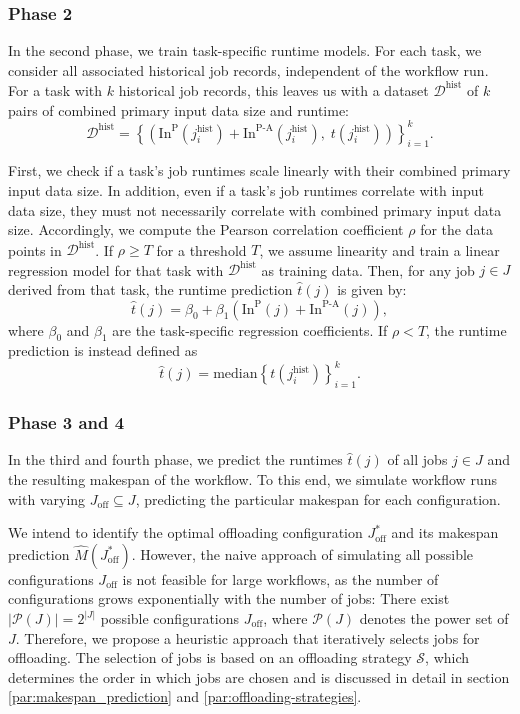 \subsubsection{Phase 2}
 In the second phase, we train task-specific runtime models. 
 For each task, we consider all associated historical job records, independent of the workflow run. For a task with $k$ historical job records, this leaves us with a dataset $\mathcal{D}^\text{hist}$ of $k$ pairs of combined primary input data size and runtime: \[ \mathcal{D}^\text{hist}=\left\{\left(\text{In}^\text{P}(j_i^\text{hist}) + \text{In}^\text{P-A}(j_i^\text{hist}),\; t(j_i^\text{hist})\right)\right\}_{i=1}^{k}. \] 
 
 First, we check if a task's job runtimes scale linearly with their combined primary input data size. 
 In addition, even if a task's job runtimes correlate with input data size, they must not necessarily correlate with combined primary input data size.
 Accordingly, we compute the Pearson correlation coefficient $\rho$ for the data points in $\mathcal{D}^\text{hist}$. If $\rho \geq T$ for a threshold $T$, we assume linearity and train a linear regression model for that task with $\mathcal{D}^\text{hist}$ as training data. Then, for any job $j \in J$ derived from that task, the runtime prediction $\hat{t}(j)$ is given by: \[ \hat{t}(j) = \beta_{0} + \beta_{1} (\text{In}^\text{P}(j) + \text{In}^\text{P-A}(j)), \] where \( \beta_{0} \) and \( \beta_{1} \) are the task-specific regression coefficients. If $\rho < T$, the runtime prediction is instead defined as \[ \hat{t}(j) = \mathrm{median}\left\{ t\!\left(j_i^\text{hist}\right) \right\}_{i=1}^k. \]
 
\subsubsection{Phase 3 and 4}
In the third and fourth phase, we predict the runtimes $\hat{t}(j)$ of all jobs $j \in J$ and the resulting makespan of the workflow. To this end, we simulate workflow runs with varying $J_{\text{off}} \subseteq J$, predicting the particular makespan for each configuration. 

We intend to identify the optimal offloading configuration $J_{\text{off}}^*$ and its makespan prediction $\hat{M}(J_{\text{off}}^*)$. 
However, the naive approach of simulating all possible configurations $J_{\text{off}}$ is not feasible for large workflows, as the number of configurations grows exponentially with the number of jobs: There exist $|\mathcal{P}(J)|=2^{|J|}$ possible configurations $J_{\text{off}}$, where $\mathcal{P}(J)$ denotes the power set of $J$. Therefore, we propose a heuristic approach that iteratively selects jobs for offloading. The selection of jobs is based on an offloading strategy $\mathcal{S}$, which determines the order in which jobs are chosen and is discussed in detail in section \ref{par:makespan_prediction} and \ref{par:offloading-strategies}.



